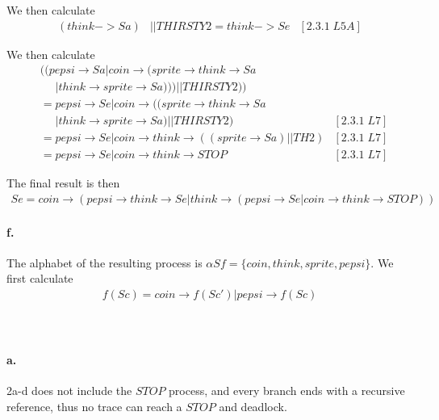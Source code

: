 \documentclass[a4paper, 11pt]{article}
\begin{document}
We then calculate
\begin{align*}
(think -> Sa) &|| THIRSTY2 = think -> Se & [2.3.1\;L5A]
\end{align*}

We then calculate 
\begin{align*}
& ((pepsi \rightarrow Sa | coin \rightarrow (sprite \rightarrow think \rightarrow Sa \\
&\phantom{=} | think \rightarrow sprite \rightarrow Sa))) || THIRSTY2)) \\
&= pepsi \rightarrow Se | coin \rightarrow ((sprite \rightarrow think \rightarrow Sa \\
&\phantom{=} | think \rightarrow sprite \rightarrow Sa) || THIRSTY2) & [2.3.1\;L7] \\
&= pepsi \rightarrow Se | coin \rightarrow think \rightarrow ((sprite \rightarrow Sa) || TH2) & [2.3.1\;L7] \\
&= pepsi \rightarrow Se | coin \rightarrow think \rightarrow STOP & [2.3.1\;L7]
\end{align*}

The final result is then
\begin{align*}
Se = coin \rightarrow (pepsi \rightarrow think \rightarrow Se | think \rightarrow (pepsi \rightarrow Se | coin \rightarrow think \rightarrow STOP))
\end{align*}


\paragraph{f.} %
\label{par:f_}

The alphabet of the resulting process is $\alpha Sf = \{coin, think, sprite, pepsi\}$. We first calculate
\begin{align*}
f(Sc) = coin \rightarrow f(Sc') | pepsi \rightarrow f(Sc)
\end{align*}

\begin{align*}

\end{align*}



\section{} %

\paragraph{a.} %
\label{par:a_}
2a-d does not include the $STOP$ process, and every branch ends with a recursive reference, thus no trace can reach a $STOP$ and deadlock.
\end{document}

